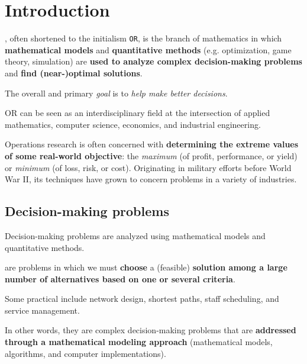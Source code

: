 \section{Introduction}

\begin{definitionbox}
    , often shortened to the initialism \texttt{OR}, is the branch of mathematics in which \textbf{mathematical models} and \textbf{quantitative methods} (e.g. optimization, game theory, simulation) are \textbf{used to analyze complex decision-making problems} and \textbf{find (near-)optimal solutions}.
\end{definitionbox}

\highspace
The overall and primary \emph{goal} is to \emph{help make better decisions}.

\highspace
OR can be seen as an interdisciplinary field at the intersection of applied mathematics, computer science, economics, and industrial engineering.

\highspace
Operations research is often concerned with \textbf{determining the extreme values of some real-world objective}: the \emph{maximum} (of profit, performance, or yield) or \emph{minimum} (of loss, risk, or cost). Originating in military efforts before World War II, its techniques have grown to concern problems in a variety of industries.\cite{wikipediaOperationsResearch}

\longline

\subsection{Decision-making problems}

Decision-making problems are analyzed using mathematical models and quantitative methods.

\begin{definitionbox}
     are problems in which we must \textbf{choose} a (feasible) \textbf{solution among a large number of alternatives based on one or several criteria}.
\end{definitionbox}

\highspace
Some practical  include network design, shortest paths, staff scheduling, and service management.

\highspace
In other words, they are complex decision-making problems that are \textbf{addressed through a mathematical modeling approach} (mathematical models, algorithms, and computer implementations).